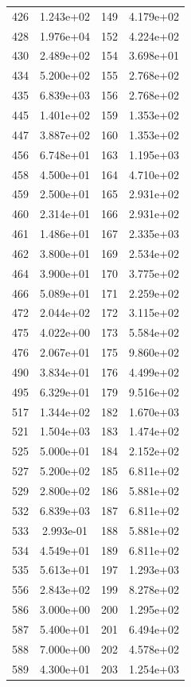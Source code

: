 \documentclass[12pt]{article}
\begin{document}
\begin{longtable}{@{}cccc@{}}
426 & 1.243e+02 & 149 & 4.179e+02 \\
428 & 1.976e+04 & 152 & 4.224e+02 \\
430 & 2.489e+02 & 154 & 3.698e+01 \\
434 & 5.200e+02 & 155 & 2.768e+02 \\
435 & 6.839e+03 & 156 & 2.768e+02 \\
445 & 1.401e+02 & 159 & 1.353e+02 \\
447 & 3.887e+02 & 160 & 1.353e+02 \\
456 & 6.748e+01 & 163 & 1.195e+03 \\
458 & 4.500e+01 & 164 & 4.710e+02 \\
459 & 2.500e+01 & 165 & 2.931e+02 \\
460 & 2.314e+01 & 166 & 2.931e+02 \\
461 & 1.486e+01 & 167 & 2.335e+03 \\
462 & 3.800e+01 & 169 & 2.534e+02 \\
464 & 3.900e+01 & 170 & 3.775e+02 \\
466 & 5.089e+01 & 171 & 2.259e+02 \\
472 & 2.044e+02 & 172 & 3.115e+02 \\
475 & 4.022e+00 & 173 & 5.584e+02 \\
476 & 2.067e+01 & 175 & 9.860e+02 \\
490 & 3.834e+01 & 176 & 4.499e+02 \\
495 & 6.329e+01 & 179 & 9.516e+02 \\
517 & 1.344e+02 & 182 & 1.670e+03 \\
521 & 1.504e+03 & 183 & 1.474e+02 \\
525 & 5.000e+01 & 184 & 2.152e+02 \\
527 & 5.200e+02 & 185 & 6.811e+02 \\
529 & 2.800e+02 & 186 & 5.881e+02 \\
532 & 6.839e+03 & 187 & 6.811e+02 \\
533 & 2.993e-01 & 188 & 5.881e+02 \\
534 & 4.549e+01 & 189 & 6.811e+02 \\
535 & 5.613e+01 & 197 & 1.293e+03 \\
556 & 2.843e+02 & 199 & 8.278e+02 \\
586 & 3.000e+00 & 200 & 1.295e+02 \\
587 & 5.400e+01 & 201 & 6.494e+02 \\
588 & 7.000e+00 & 202 & 4.578e+02 \\
589 & 4.300e+01 & 203 & 1.254e+03 \\

\end{longtable}
\end{document}
